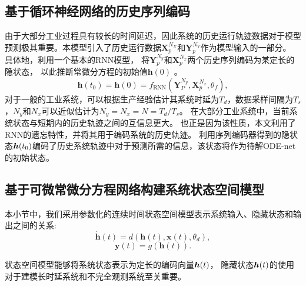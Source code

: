 \subsection{基于循环神经网络的历史序列编码}
由于大部分工业过程具有较长的时间延迟，因此系统的历史运行轨迹数据对于模型预测极其重要。本模型引入了历史运行数据$\boldsymbol {X}_{p}^{N_{X}}$和$\boldsymbol {Y}_{p}^{N_{Y}}$作为模型输入的一部分。
具体地，利用一个基本的RNN模型，
将$\boldsymbol{Y}_p^{N_y}$和$\boldsymbol {X}_p^{N_x}$两个历史序列编码为某定长的隐状态，
以此推断常微分方程的初始值$\boldsymbol{h}(0)$ 。
\begin{equation}
\label{equ:rnn_encoder}
 \boldsymbol{h}(t_0) = \boldsymbol{h}(0) = f_{\text{RNN}}(\boldsymbol{Y}_P^{N_y},\boldsymbol X_p^{N_x},\theta _f),
\end{equation}
对于一般的工业系统，可以根据生产经验估计其系统时延为$T_d$，数据采样间隔为$T_s$，$N_y$和$N_x$可以近似估计为$N_y = N_x = N = T_d/T_s$。
在大部分工业系统中，当前系统状态与短期内的历史轨迹之间的互信息更大。
也正是因为该性质，本文利用了RNN的遗忘特性，并将其用于编码系统的历史轨迹。
利用序列编码器得到的隐状态$\boldsymbol h(t_0)$编码了历史系统轨迹中对于预测所需的信息，该状态将作为待解ODE-net的初始状态。

\subsection{基于可微常微分方程网络构建系统状态空间模型}
\label{sec:ODE-net}
本小节中，我们采用参数化的连续时间状态空间模型表示系统输入、隐藏状态和输出之间的关系:
\begin{equation}
    \label{equ:ct_state_space}
     \dot{\boldsymbol h}(t)=d(\boldsymbol{h}(t), \boldsymbol{x}(t), \theta _d),
\end{equation}
\begin{equation}
\boldsymbol{y}(t)=g(\boldsymbol{h}(t)).
\end{equation}

状态空间模型能够将系统状态表示为定长的编码向量$\boldsymbol h(t)$，
隐藏状态$\boldsymbol h(t)$的使用对于建模长时延系统和不完全观测系统至关重要。

